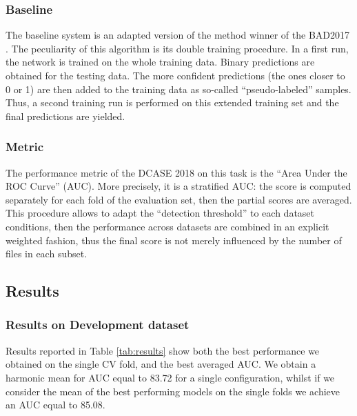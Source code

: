 \subsubsection{Baseline}
The baseline system is an adapted version of the method winner of the BAD2017 \cite{grill2017two}. The peculiarity of this algorithm is its double training procedure. In a first run, the network is trained on the whole training data. Binary predictions are obtained for the testing data. The more confident predictions (the ones closer to 0 or 1) are then added to the training data as so-called ``pseudo-labeled'' samples. Thus, a second training run is performed on this extended training set and the final predictions are yielded.


\subsubsection{Metric}
The performance metric of the DCASE 2018 on this task is the ``Area Under the ROC Curve'' (AUC). More precisely, it is a stratified AUC: the score is computed separately for each fold of the evaluation set, then the partial scores are averaged. This procedure allows to adapt the ``detection threshold'' to each dataset conditions, then the performance across datasets are combined in an explicit weighted fashion, thus the final score is not merely influenced by the number of files in each subset.


\subsection{Results}
\label{sec:results}
\subsubsection{Results on Development dataset}
Results reported in Table \ref{tab:results} show both the best performance we obtained on the single CV fold, and the best averaged AUC. We obtain a harmonic mean for AUC equal to 83.72 for a single configuration, whilst if we consider the mean of the best performing models on the single folds we achieve an AUC equal to 85.08.


%
%


